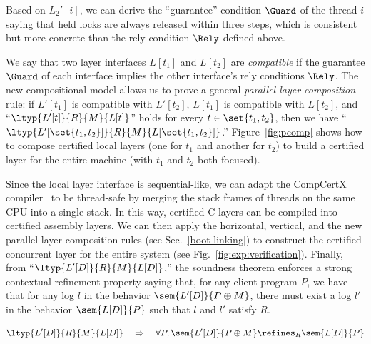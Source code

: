 Based on $L_2'[i]$, we can  derive the ``guarantee'' condition $\Guard$ of the thread $i$ saying that held locks are always released within three steps, which is consistent but more concrete than the rely condition $\Rely$ defined above.

We say that two layer interfaces $L[t_1]$ and $L[t_2]$ are {\em compatible} if the guarantee $\Guard$ of
each interface implies the other interface's rely conditions $\Rely$.  The new
compositional model allows us to prove a general {\em parallel layer
  composition} rule: if $L'[t_1]$ is compatible with $L'[t_2]$, $L[t_1]$ is compatible with $L[t_2]$, and
``$\ltyp{L'[t]}{R}{M}{L[t]}$'' holds for every $t\in \set{t_1,t_2}$, then we  have
``$\ltyp{L'[\set{t_1,t_2}]}{R}{M}{L[\set{t_1,t_2}]}$.'' Figure~\ref{fig:pcomp} shows how to compose
certified local layers (one for $t_1$ and another for $t_2$) to
build a certified layer for the entire machine (with $t_1$ and $t_2$
both focused).

Since the local layer interface is sequential-like, we can adapt the CompCertX compiler~\cite{dscal15} to be thread-safe by merging the stack frames of threads on the same CPU into a single stack. In this way, 
certified C layers can be compiled into certified assembly layers. We can then apply the horizontal, 
vertical, and the new parallel layer
composition rules (see Sec.~\ref{boot-linking}) to construct the certified concurrent layer for the entire system (see Fig.~\ref{fig:exp:verification}). Finally, from ``$\ltyp{L'[D]}{R}{M}{L[D]}$,'' the soundness theorem enforces a strong contextual refinement property saying that, for any client program $P$, we have that for any log $l$ in the behavior $\sem{L'[D]}{P \oplus M}$, there must exist a log $l'$ in the behavior $\sem{L[D]}{P}$
such that $l$ and $l'$ satisfy $R$.

\begin{theorem}[Soundness]
$$\ltyp{L'[D]}{R}{M}{L[D]} \quad\Rightarrow\quad \forall P, \sem{L'[D]}{P\oplus{}M} \refines_R \sem{L[D]}{P}$$
\end{theorem}
